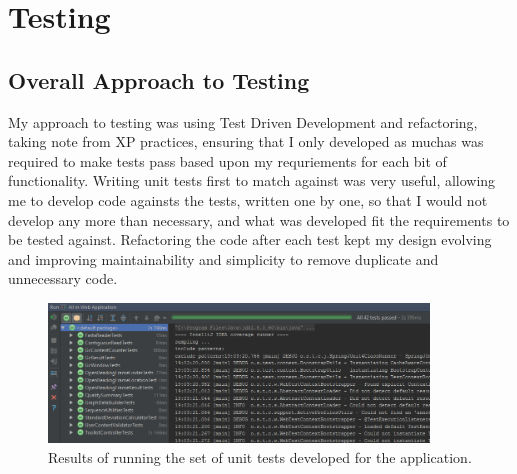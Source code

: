 \chapter{Testing}




\section{Overall Approach to Testing}
My approach to testing was using Test Driven Development and refactoring, taking note from XP practices, ensuring that I only developed as muchas was required to make tests pass based upon my requriements for each bit of functionality. Writing unit tests first to match against was very useful, allowing me to develop code againsts the tests, written one by one, so that I would not develop any more than necessary, and what was developed fit the requirements to be tested against. Refactoring the code after each test kept my design evolving and improving maintainability and simplicity to remove duplicate and unnecessary code.

\begin{figure}[H]
\centering
\includegraphics[width=0.9\textwidth]{images/unittestsuccess}
\caption{Results of running the set of unit tests developed for the application.}
\end{figure}

